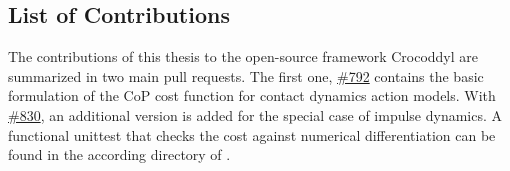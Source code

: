 \subsection{List of Contributions}
The contributions of this thesis to the open-source framework Crocoddyl are summarized in two main pull requests. The first one, \hyperlink{https://github.com/loco-3d/crocoddyl/pull/792}{\#792} contains the basic formulation of the \gls{CoP} cost function for contact dynamics action models. With \hyperlink{https://github.com/loco-3d/crocoddyl/pull/830}{\#830}, an additional version is added for the special case of impulse dynamics.
A functional unittest that checks the cost against numerical differentiation can be found in the according directory of \cite{crocoddylweb}.

















